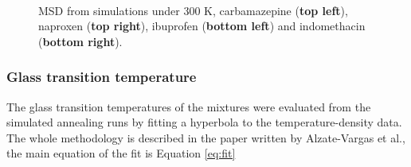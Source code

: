 \begin{figure}[H]
	\centering
	\\
	\caption{MSD from simulations under 300 K, carbamazepine (\textbf{top left}), naproxen (\textbf{top right}), ibuprofen (\textbf{bottom left}) and indomethacin (\textbf{bottom right}).}
	\label{fig:msd_r1}    
\end{figure}

\subsubsection{Glass transition temperature}
The glass transition temperatures of the mixtures were evaluated from the simulated annealing runs by fitting a hyperbola to the temperature-density data. The whole methodology is described in the paper written by Alzate-Vargas et al.\cite{alzate-vargas_uncertainties_2018}, the main equation of the fit is Equation \ref{eq:fit}

